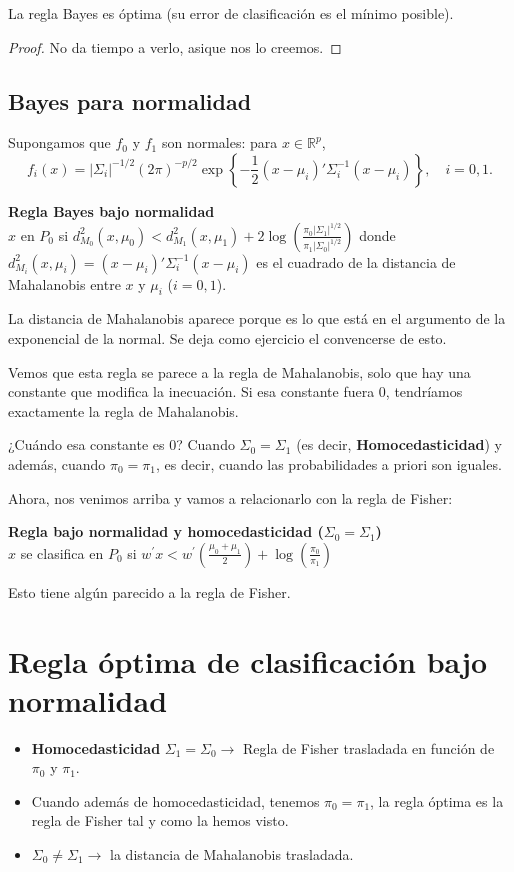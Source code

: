 \begin{prop}
La regla Bayes es óptima (su error de clasificación es el mínimo posible).
\end{prop}
\begin{proof}
No da tiempo a verlo, asique nos lo creemos.
\end{proof}
\subsection{Bayes para normalidad}

Supongamos que $f_0$ y $f_1$ son normales: para $x\in\mathbb{R}^p$,
\[
f_i(x) = |\Sigma_i|^{-1/2}(2\pi)^{-p/2}\exp\left\{-\frac{1}{2}(x-\mu_i)'\Sigma_i^{-1}(x-\mu_i)    \right\},\quad i=0,1.
\]


\textbf{Regla Bayes bajo normalidad}\\
$x$ en $P_0$ si $\displaystyle  d_{M_0}^2(x,\mu_0)<d^2_{M_1}(x,\mu_1)+2\log\left(\frac{\pi_0|\Sigma_1|^{1/2}}{\pi_1|\Sigma_0|^{1/2}}\right)$
donde $\displaystyle d_{M_i}^2(x,\mu_i)=(x-\mu_i)'\Sigma_i^{-1}(x-\mu_i)$ es el cuadrado de la distancia de Mahalanobis entre $x$ y $\mu_i$ ($i=0,1$).

La distancia de Mahalanobis aparece porque es lo que está en el argumento de la exponencial de la normal. Se deja como ejercicio el convencerse de esto.


\obs Vemos que esta regla se parece a la regla de Mahalanobis, solo que hay una constante que modifica la inecuación. Si esa constante fuera 0, tendríamos exactamente la regla de Mahalanobis.

¿Cuándo esa constante es 0? Cuando $Σ_0 = Σ_1$ (es decir, \textbf{Homocedasticidad}) y además, cuando $π_0 = π_1$, es decir, cuando las probabilidades a priori son iguales. 


\obs Ahora, nos venimos arriba y vamos a relacionarlo con la regla de Fisher:

\textbf{Regla bajo normalidad y homocedasticidad ($\Sigma_0=\Sigma_1$)}\\
$x$ se clasifica en $P_0$ si
$\displaystyle  w^\prime  x < w^\prime  \left(\frac{\mu_0+\mu_1}{2}\right)+  \log\left(\frac{\pi_0}{\pi_1}\right)$


Esto tiene algún parecido a la regla de Fisher.


\section{Regla óptima de clasificación bajo normalidad}

\begin{itemize}
  \item \textbf{Homocedasticidad} $Σ_1 = Σ_0 \to$ Regla de Fisher trasladada en función de $π_0$ y $π_1$.
  \item Cuando además de homocedasticidad, tenemos $π_0 = π_1$, la regla óptima es la regla de Fisher tal y como la hemos visto.
  \item $Σ_0 ≠ Σ_1 \to $ la distancia de Mahalanobis trasladada.
\end{itemize}

